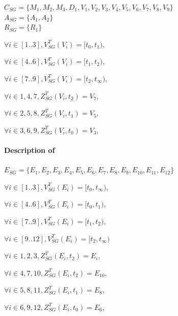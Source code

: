 $C_{SG} = \{M_1, M_2, M_3, D_1, V_1, V_2, V_3, V_4, V_5, V_6, V_7, V_8, V_9\}$\\
$A_{SG} = \{A_1, A_2\}$\\
$R_{SG} = \{R_1\}$

\begin{condItemize}
	\item $\forall i \in [1..3], V^T_{SG}(V_i) = [t_0, t_1)$,
	\item $\forall i \in [4..6], V^T_{SG}(V_i) = [t_1, t_2)$,
	\item $\forall i \in [7..9], V^T_{SG}(V_i) = [t_2, t_\infty)$,
\end{condItemize}

\begin{condItemize}
	\item $\forall i \in {1, 4, 7}, Z^T_{SG}(V_i, t_2) = V_7$,
	\item $\forall i \in {2, 5, 8}, Z^T_{SG}(V_i, t_1) = V_5$,
	\item $\forall i \in {3, 6, 9}, Z^T_{SG}(V_i, t_0) = V_3$,
\end{condItemize}

\paragraph{Description of  }

$E_{SG} = \{ E_1, E_2, E_3, E_4, E_5, E_6, E_7, E_8, E_9, E_10, E_11, E_12\}$

\begin{condItemize}
	\item $\forall i \in [1..3], V^T_{SG}(E_i) = [t_0, t_\infty)$,
	\item $\forall i \in [4..6], V^T_{SG}(E_i) = [t_0, t_1)$,
	\item $\forall i \in [7..9], V^T_{SG}(E_i) = [t_1, t_2)$,
	\item \item $\forall i \in [9..12], V^T_{SG}(E_i) = [t_2, t_\infty)$
\end{condItemize}

\begin{condItemize}
	\item $\forall i \in {1, 2, 3}, Z^T_{SG}(E_i, t_2) = E_i$,
	\item $\forall i \in {4, 7, 10}, Z^T_{SG}(E_i, t_2) = E_10$,
	\item $\forall i \in {5, 8, 11}, Z^T_{SG}(E_i, t_1) = E_8$,
	\item $\forall i \in {6, 9, 12}, Z^T_{SG}(E_i, t_0) = E_6$,
\end{condItemize}

